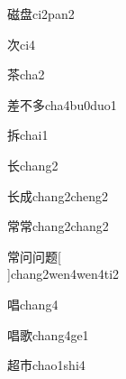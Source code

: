 \begin{verbete}[14;11]{磁盘}{ci2pan2}
\end{verbete}

\begin{verbete}[6]{次}{ci4}
\end{verbete}

\begin{verbete}[9]{茶}{cha2}
\end{verbete}

\begin{verbete}[9;4;6]{差不多}{cha4bu0duo1}
\end{verbete}

\begin{verbete}[8]{拆}{chai1}
\end{verbete}

\begin{verbete}[4]{长}{chang2}
\end{verbete}

\begin{verbete}[4;6]{长成}{chang2cheng2}
\end{verbete}

\begin{verbete}[11;11]{常常}{chang2chang2}
\end{verbete}

\begin{verbete}[11;6;6;15]{常问问题}[\\]{chang2wen4wen4ti2}
\end{verbete}

\begin{verbete}[11]{唱}{chang4}
\end{verbete}

\begin{verbete}[11;14]{唱歌}{chang4ge1}
\end{verbete}

\begin{verbete}[12;5]{超市}{chao1shi4}
\end{verbete}


